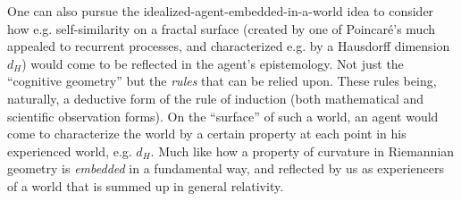 One can also pursue the idealized-agent-embedded-in-a-world idea to consider how e.g. self-similarity on a fractal surface (created by one of Poincar\'e's much appealed to recurrent processes, and characterized e.g. by a Hausdorff dimension $d_H$) would come to be reflected in the agent's epistemology.  Not just the ``cognitive geometry'' but the \emph{rules} that can be relied upon.  These rules being, naturally, a deductive form of the rule of induction (both mathematical and scientific observation forms).  On the ``surface'' of such a world, an agent would come to characterize the world by a certain property at each point in his experienced world, e.g. $d_H$.  Much like how a property of curvature in Riemannian geometry is \emph{embedded} in a fundamental way, and reflected by us as experiencers of a world that is summed up in general relativity.

